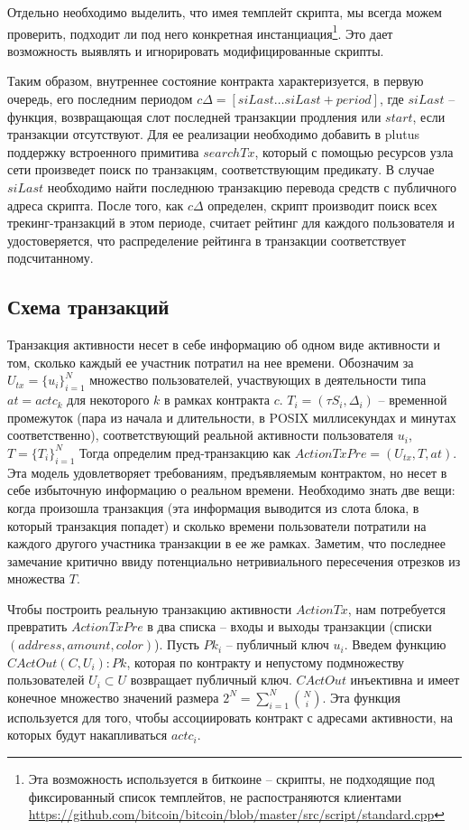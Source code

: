 \documentclass[specification,annotation]{itmo-student-thesis}
\begin{document}
Отдельно необходимо выделить, что имея темплейт скрипта, мы всегда
можем проверить, подходит ли под него конкретная
инстанциация\footnote{Эта возможность используется в биткоине --
  скрипты, не подходящие под фиксированный список темплейтов, не
  распостраняются клиентами
  \url{https://github.com/bitcoin/bitcoin/blob/master/src/script/standard.cpp}}. Это
дает возможность выявлять и игнорировать модифицированные скрипты.

Таким образом, внутреннее состояние контракта характеризуется, в
первую очередь, его последним периодом $c\Delta = [siLast \ldots
siLast+period]$, где $siLast$ -- функция, возвращающая слот
последней транзакции продления или $start$, если транзакции
отсутствуют. Для ее реализации необходимо добавить в plutus поддержку
встроенного примитива $searchTx$, который с помощью ресурсов узла сети
произведет поиск по транзакцям, соответствующим предикату. В случае
$siLast$ необходимо найти последнюю транзакцию перевода средств с
публичного адреса скрипта. После того, как $c\Delta$ определен, скрипт
производит поиск всех трекинг-транзакций в этом периоде, считает
рейтинг для каждого пользователя и удостоверяется, что распределение
рейтинга в транзакции соответствует подсчитанному.

\subsection{Схема транзакций}

Транзакция активности несет в себе информацию об одном виде активности
и том, сколько каждый ее участник потратил на нее времени. Обозначим
за $U_{tx} = \{u_i\}_{i=1}^N$ множество пользователей, участвующих в
деятельности типа $at = actc_k$ для некоторого $k$ в рамках контракта
$c$. $T_i = (\tau S_i, \Delta_i)$ -- временной промежуток (пара из
начала и длительности, в POSIX миллисекундах и минутах
соответственно), соответствующий реальной активности пользователя
$u_i$, $T = \{T_i\}_{i=1}^N$ Тогда определим пред-транзакцию как
$ActionTxPre = (U_{tx}, T, at)$. Эта модель удовлетворяет требованиям,
предъявляемым контрактом, но несет в себе избыточную информацию о
реальном времени. Необходимо знать две вещи: когда произошла
транзакция (эта информация выводится из слота блока, в который
транзакция попадет) и сколько времени пользователи потратили на
каждого другого участника транзакции в ее же рамках. Заметим, что
последнее замечание критично ввиду потенциально нетривиального
пересечения отрезков из множества $T$.

Чтобы построить реальную транзакцию активности $ActionTx$, нам
потребуется превратить $ActionTxPre$ в два списка -- входы и выходы
транзакции (списки $(address,amount,color)$). Пусть $Pk_i$ --
публичный ключ $u_i$. Введем функцию $CActOut(C, U_i) : Pk$, которая
по контракту и непустому подмножеству пользователей $U_i \subset U$
возвращает публичный ключ. $CActOut$ инъективна и имеет конечное множество
значений размера $2^N = \sum_{i=1}^N{\binom{N}{i}}$. Эта функция
используется для того, чтобы ассоциировать контракт с адресами
активности, на которых будут накапливаться $actc_i$.
\end{document}
